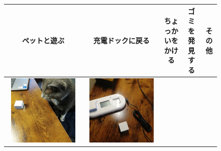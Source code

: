 \documentclass[paper=a4paper,jafontsize=9pt,head_space=15mm,gutter=20mm,
twocolumn,number_of_lines=49, line_length=26zw]{myuarticle}
\begin{document}
\setcounter{figure}{2}
\begin{figure}[t]
  \centering
  \label{tab:theme-test}
  \begin{tabular}{|c|c|c|c|c|}
    \hline
    \sffamily ペットと遊ぶ                                                & \sffamily 充電ドックに戻る & \sffamily ちょっかいをかける & \sffamily ゴミを発見する & \sffamily その他 \\
    \hline \hline
    \begin{minipage}[c]{0.15\textwidth}
      \centering
      \includegraphics[width=0.9\textwidth]{resources/cat_before.jpg}
    \end{minipage}    &
    \begin{minipage}[c]{0.15\textwidth}
      \centering
      \includegraphics[width=0.9\textwidth]{resources/doc_before.jpg}

\end{minipage}
\end{tabular}
\end{figure}
\end{document}
